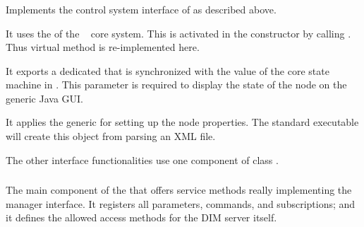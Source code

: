 \subsubsection{}
\label{prog_manager_controls_DIM_manager}
Implements the control system interface of
 as described above. 

\begin{compactenum}

\item It uses the  of the \dabc~ core system.
This is activated in the constructor by calling
. Thus virtual method 
is  re-implemented here.

\item It exports a dedicated  that is
synchronized with the value of the core state machine in . 
This parameter is required to display the state of the node on the generic
Java GUI.

\item It applies the generic   for setting up
the node properties. The standard executable   will create 
this object from parsing an XML file. 

\item The other interface functionalities use one
component of class .

\end{compactenum}




\subsubsection{}
\label{prog_manager_controls_DIM_registry}
The main component of the  that
offers service methods really implementing the manager interface.
It registers all parameters, commands, and subscriptions; 
and it defines the allowed access methods for the DIM server itself.
 

